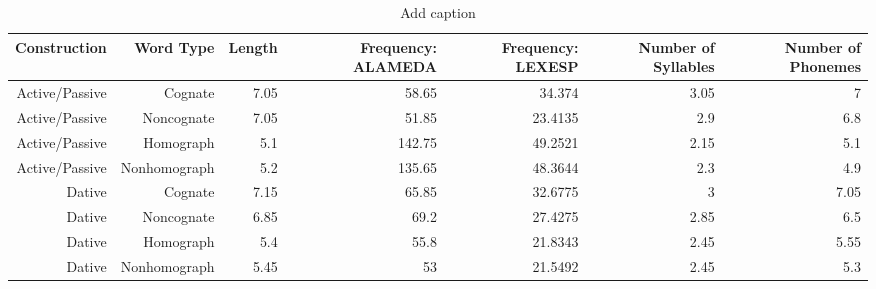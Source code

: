 \begin{table}[htbp]
  \centering
  \caption{Add caption}
    \begin{tabular}{rrrrrrr}
    \toprule
    Construction & Word Type & Length & Frequency: ALAMEDA & Frequency: LEXESP & Number of Syllables & Number of Phonemes \\
    \midrule
    Active/Passive & Cognate & 7.05  & 58.65 & 34.374 & 3.05  & 7 \\
    Active/Passive & Noncognate & 7.05  & 51.85 & 23.4135 & 2.9   & 6.8 \\
    Active/Passive & Homograph & 5.1   & 142.75 & 49.2521 & 2.15  & 5.1 \\
    Active/Passive & Nonhomograph & 5.2   & 135.65 & 48.3644 & 2.3   & 4.9 \\
    Dative & Cognate & 7.15  & 65.85 & 32.6775 & 3     & 7.05 \\
    Dative & Noncognate & 6.85  & 69.2  & 27.4275 & 2.85  & 6.5 \\
    Dative & Homograph & 5.4   & 55.8  & 21.8343 & 2.45  & 5.55 \\
    Dative & Nonhomograph & 5.45  & 53    & 21.5492 & 2.45  & 5.3 \\
    \bottomrule
    \end{tabular}%
  \label{tab:addlabel}%
\end{table}%
